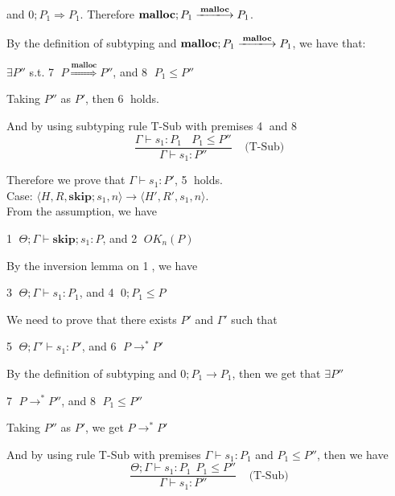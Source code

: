 \documentclass[english]{jssst_ppl} %
\newcommand\SKIP{\mathbf{skip}}
\newcommand\Rtab{\; \; \; \;}
\newcommand\Malloc{\mathbf{malloc}}
\theoremstyle{definition}
\begin{document}
and $0;P_{1} \Rightarrow P_{1}$. Therefore $\Malloc;P_{1} \xlongrightarrow{\Malloc} P_{1}$.

By the definition of subtyping and $\Malloc;P_{1} \xlongrightarrow{\Malloc} P_{1}$, we have that:
\begin{center}
$\exists P''$ s.t. \textcircled{7} $P \overset{\text{$\Malloc$}}{\Longrightarrow} P''$, and \textcircled{8} $P_{1} \le P''$
 \end{center}

Taking $P''$ as $P'$, then \textcircled{6} holds.

And by using subtyping rule T-Sub with premises \textcircled{4} and \textcircled{8}
$$
    \frac{\Gamma \vdash s_{1} : P_{1} \ \ \ \ P_{1} \le P''}
     {\Gamma \vdash s_{1} : P''}
     \Rtab \mbox{(T-Sub)}
$$

Therefore we prove that $\Gamma \vdash s_{1} : P'$, \textcircled{5} holds.\\

\noindent Case: $\langle H, R, \SKIP;s_{1}, n \rangle \rightarrow \langle H', R', s_{1}, n \rangle $. \\

From the assumption, we have
\begin{center}
\textcircled{1} $\Theta; \Gamma \vdash \SKIP;s_{1} : P$, and \textcircled{2} $OK_{n}(P)$
\end{center}

By the inversion lemma on \textcircled{1}, we have
\begin{center}
\textcircled{3} $\Theta; \Gamma \vdash s_{1} : P_{1}$, and \textcircled{4} $0;P_{1} \le P $
\end{center}

We need to prove that there exists $P'$ and $\Gamma'$ such that
\begin{center}
\textcircled{5} $\Theta; \Gamma' \vdash s_{1} : P'$, and \textcircled{6} $P \rightarrow^{*} P'$
\end{center}

By the definition of subtyping and $0;P_{1} \rightarrow P_{1}$, then we get that $\exists P''$
\begin{center}
 \textcircled{7} $P \rightarrow^{*} P''$, and \textcircled{8} $P_{1} \le P''$
\end{center}

Taking $P''$ as  $P'$, we get $P \rightarrow^{*} P'$

And by using rule T-Sub with premises $\Gamma \vdash s_{1} : P_{1}$ and $P_{1} \le P''$, then we have 
$$
    \frac{\Theta; \Gamma \vdash s_{1} : P_{1} \  \  P_{1} \le P''}
    {\Gamma \vdash s_{1} : P''}
    \Rtab \mbox{(T-Sub)}
$$
\end{document}
